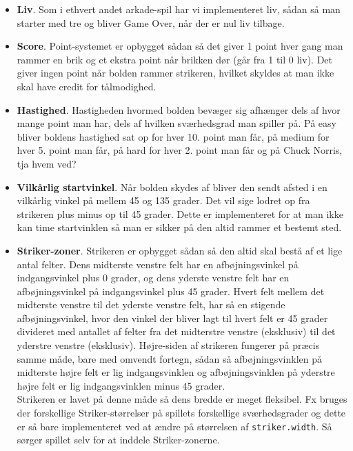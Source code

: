 \begin{itemize}
\item \textbf{Liv}. Som i ethvert andet arkade-spil har vi implementeret liv, sådan så man starter med tre og bliver Game Over, når der er nul liv tilbage.

\item \textbf{Score}. Point-systemet er opbygget sådan så det giver 1 point hver gang man rammer en brik og et ekstra point når brikken dør (går fra 1 til 0 liv). Det giver ingen point når bolden rammer strikeren, hvilket skyldes at man ikke skal have credit for tålmodighed.

\item \textbf{Hastighed}. Hastigheden hvormed bolden bevæger sig afhænger dels af hvor mange point man har, dels af hvilken sværhedsgrad man spiller på. På easy bliver boldens hastighed sat op for hver 10. point man får, på medium for hver 5. point man får, på hard for hver 2. point man får og på Chuck Norris, tja hvem ved?

\item \textbf{Vilkårlig startvinkel}. Når bolden skydes af bliver den sendt afsted i en vilkårlig vinkel på mellem 45 og 135 grader. Det vil sige lodret op fra strikeren plus minus op til 45 grader. Dette er implementeret for at man ikke kan time startvinklen så man er sikker på den altid rammer et bestemt sted.

\item \textbf{Striker-zoner}. Strikeren er opbygget sådan så den altid skal bestå af et lige antal felter. Dens midterste venstre felt har en afbøjningsvinkel på indgangsvinkel plus 0 grader, og dens yderste venstre felt har en afbøjningsvinkel på indgangsvinkel plus 45 grader. Hvert felt mellem det midterste venstre til det yderste venstre felt, har så en stigende afbøjningsvinkel, hvor den vinkel der bliver lagt til hvert felt er 45 grader divideret med antallet af felter fra det midterstre venstre (eksklusiv) til det yderstre venstre (eksklusiv). Højre-siden af strikeren fungerer på præcis samme måde, bare med omvendt fortegn, sådan så afbøjningsvinklen på midterste højre felt er lig indgangsvinklen og afbøjningsvinklen på yderstre højre felt er lig indgangsvinklen minus 45 grader.\\

Strikeren er lavet på denne måde så dens bredde er meget fleksibel. Fx bruges der forskellige Striker-størrelser på spillets forskellige sværhedsgrader og dette er så bare implementeret ved at ændre på størrelsen af \texttt{striker.width}. Så sørger spillet selv for at inddele Striker-zonerne. 


\end{itemize}
